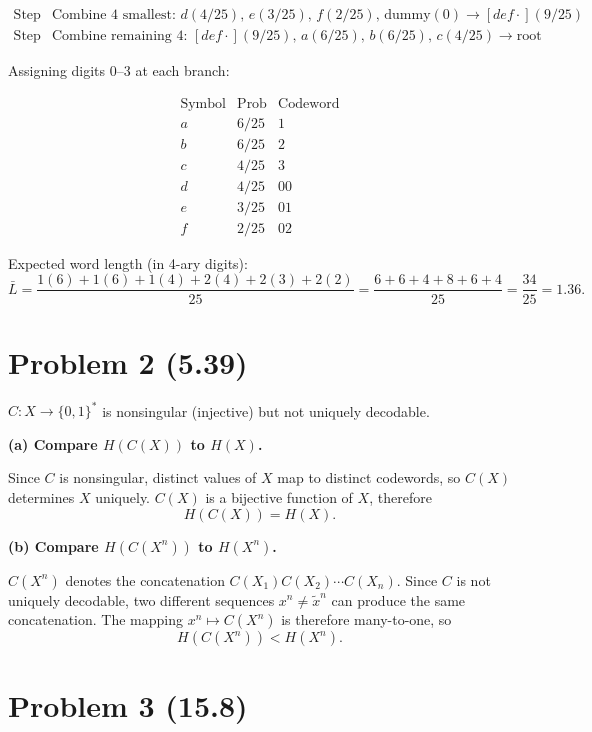 \documentclass[11pt,a4paper]{article}
\begin{document}
\[
\begin{array}{ll}
\text{Step 1:} & \text{Combine 4 smallest: }d(4/25),\,e(3/25),\,f(2/25),\,\text{dummy}(0)\to [def\cdot](9/25)\\
\text{Step 2:} & \text{Combine remaining 4: }[def\cdot](9/25),\,a(6/25),\,b(6/25),\,c(4/25)\to\text{root}
\end{array}
\]

Assigning digits 0--3 at each branch:

\[
\begin{array}{c|c|c}
\text{Symbol} & \text{Prob} & \text{Codeword}\\\hline
a & 6/25 & 1 \\
b & 6/25 & 2 \\
c & 4/25 & 3 \\
d & 4/25 & 00 \\
e & 3/25 & 01 \\
f & 2/25 & 02
\end{array}
\]

Expected word length (in 4-ary digits):
\[
\bar{L} = \frac{1(6)+1(6)+1(4)+2(4)+2(3)+2(2)}{25}
= \frac{6+6+4+8+6+4}{25} = \frac{34}{25} = 1.36.
\]

\section*{Problem 2 \normalfont\small(5.39)}

$C:X\to\{0,1\}^*$ is nonsingular (injective) but not uniquely decodable.

\textbf{(a) Compare $H(C(X))$ to $H(X)$.}

Since $C$ is nonsingular, distinct values of $X$ map to distinct codewords,
so $C(X)$ determines $X$ uniquely.
$C(X)$ is a bijective function of $X$, therefore
\[
  H(C(X)) = H(X).
\]

\textbf{(b) Compare $H(C(X^n))$ to $H(X^n)$.}

$C(X^n)$ denotes the concatenation $C(X_1)C(X_2)\cdots C(X_n)$.
Since $C$ is not uniquely decodable, two different sequences $x^n\neq \tilde{x}^n$
can produce the same concatenation.  The mapping $x^n\mapsto C(X^n)$ is
therefore many-to-one, so
\[
  H(C(X^n)) < H(X^n).
\]

\section*{Problem 3 \normalfont\small(15.8)}
\end{document}

